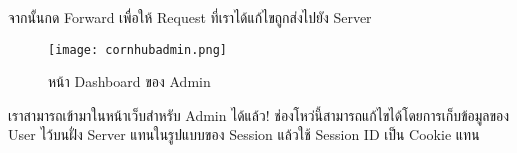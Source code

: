 \newpage

จากนั้นกด Forward เพื่อให้ Request ที่เราได้แก้ไขถูกส่งไปยัง Server

\begin{figure}[h]
	\centering
	\texttt{[image: cornhubadmin.png]}
	\caption{หน้า Dashboard ของ Admin}
	\label{Fig:cornhubadmin.png}
\end{figure}

เราสามารถเข้ามาในหน้าเว็บสำหรับ Admin ได้แล้ว! ช่องโหว่นี้สามารถแก้ไขได้โดยการเก็บข้อมูลของ User ไว้บนฝั่ง Server แทนในรูปแบบของ Session แล้วใช้ Session ID เป็น Cookie แทน

